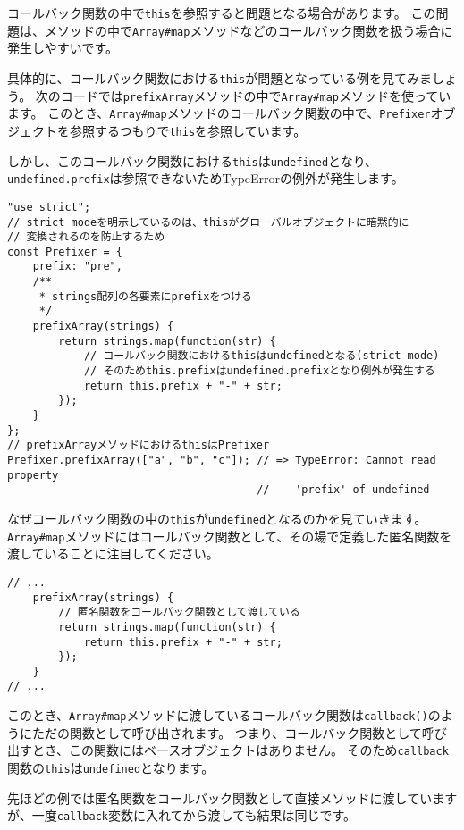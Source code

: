 コールバック関数の中で\texttt{this}を参照すると問題となる場合があります。
この問題は、メソッドの中で\texttt{Array\#map}メソッドなどのコールバック関数を扱う場合に発生しやすいです。

具体的に、コールバック関数における\texttt{this}が問題となっている例を見てみましょう。
次のコードでは\texttt{prefixArray}メソッドの中で\texttt{Array\#map}メソッドを使っています。
このとき、\texttt{Array\#map}メソッドのコールバック関数の中で、\texttt{Prefixer}オブジェクトを参照するつもりで\texttt{this}を参照しています。

しかし、このコールバック関数における\texttt{this}は\texttt{undefined}となり、\texttt{undefined.prefix}は参照できないためTypeErrorの例外が発生します。

\begin{lstlisting}
"use strict";
// strict modeを明示しているのは、thisがグローバルオブジェクトに暗黙的に
// 変換されるのを防止するため
const Prefixer = {
    prefix: "pre",
    /**
     * strings配列の各要素にprefixをつける
     */
    prefixArray(strings) {
        return strings.map(function(str) {
            // コールバック関数におけるthisはundefinedとなる(strict mode)
            // そのためthis.prefixはundefined.prefixとなり例外が発生する
            return this.prefix + "-" + str;
        });
    }
};
// prefixArrayメソッドにおけるthisはPrefixer
Prefixer.prefixArray(["a", "b", "c"]); // => TypeError: Cannot read property 
                                       //    'prefix' of undefined
\end{lstlisting}

なぜコールバック関数の中の\texttt{this}が\texttt{undefined}となるのかを見ていきます。
\texttt{Array\#map}メソッドにはコールバック関数として、その場で定義した匿名関数を渡していることに注目してください。

\begin{lstlisting}
// ...
    prefixArray(strings) {
        // 匿名関数をコールバック関数として渡している
        return strings.map(function(str) {
            return this.prefix + "-" + str;
        });
    }
// ...
\end{lstlisting}

このとき、\texttt{Array\#map}メソッドに渡しているコールバック関数は\texttt{callback()}のようにただの関数として呼び出されます。
つまり、コールバック関数として呼び出すとき、この関数にはベースオブジェクトはありません。
そのため\texttt{callback}関数の\texttt{this}は\texttt{undefined}となります。

先ほどの例では匿名関数をコールバック関数として直接メソッドに渡していますが、一度\texttt{callback}変数に入れてから渡しても結果は同じです。

